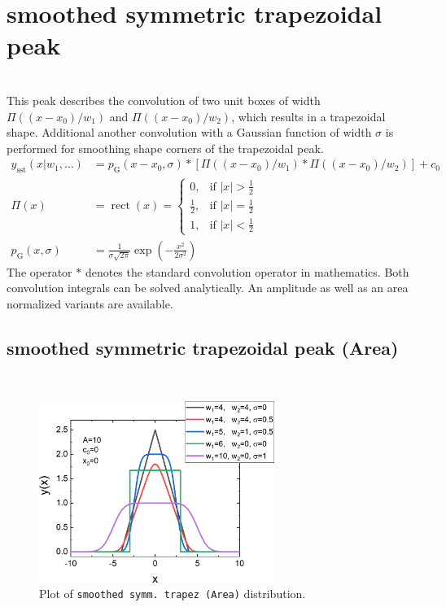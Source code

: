 \clearpage
\section{smoothed symmetric trapezoidal peak} ~\\
\label{sec:smoothedsymmetrictrapezoidal}
This peak describes the convolution of two unit boxes of width $\Pi((x-x_0)/w_1)$ and $\Pi((x-x_0)/w_2)$, which results in a trapezoidal shape. Additional another convolution with a Gaussian function of width $\sigma$ is performed for smoothing shape corners of the trapezoidal peak.
\begin{align}
y_\mathrm{sst}(x|w_1,\ldots) &= p_\mathrm{G}(x-x_0,\sigma) \ast \left[\Pi((x-x_0)/w_1) \ast \Pi((x-x_0)/w_2)\right] +c_0\\
\Pi(x) &= \displaystyle \operatorname {rect} (x)
        = \left\{{\begin{array}{rl}0,&{\text{if }}|x|>{\frac {1}{2}}\\
                                   {\frac {1}{2}},&{\text{if }}|x|={\frac {1}{2}}\\
                                   1,&{\text{if }}|x|<{\frac {1}{2}}
                  \end{array}}
           \right.  \\
p_\mathrm{G}(x,\sigma) &= \frac{1}{\sigma\sqrt{2\pi}} \exp\left(-\frac{x^2}{2\sigma^2}\right)
\end{align}
The operator $\ast$ denotes the standard convolution operator in mathematics. Both convolution integrals can be solved analytically. An amplitude as well as an area normalized variants are available.

\subsection{smoothed symmetric trapezoidal peak (Area)} ~\\

\begin{figure}[htb]
\begin{center}
\includegraphics[width=0.6824\textwidth]{../images/peaks/trapez/smoothedtrapezArea.png}
\end{center}
\caption{Plot of \texttt{smoothed symm.\ trapez (Area)} distribution.}
\label{fig:smoothedsymmtrapeztArea}
\end{figure}


